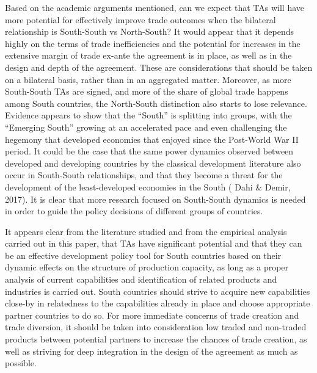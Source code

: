 \documentclass[12pt]{article}%
\begin{document}
Based on the academic arguments mentioned, can we expect that TAs will
have more potential for effectively improve trade outcomes when the
bilateral relationship is South-South vs North-South? It would appear
that it depends highly on the terms of trade inefficiencies and the
potential for increases in the extensive margin of trade ex-ante the
agreement is in place, as well as in the design and depth of the
agreement. These are considerations that should be taken on a bilateral
basis, rather than in an aggregated matter. Moreover, as more
South-South TAs are signed, and more of the share of global trade
happens among South countries, the North-South distinction also starts
to lose relevance. Evidence appears to show that the ``South'' is
splitting into groups, with the ``Emerging South'' growing at an
accelerated pace and even challenging the hegemony that developed
economies that enjoyed since the Post-World War II period. It could be
the case that the same power dynamics observed between developed and
developing countries by the classical development literature also occur
in South-South relationships, and that they become a threat for the
development of the least-developed economies in the South (\cite{dahi_south-south_2017} Dahi \&
Demir, 2017). It is clear that more research focused on South-South
dynamics is needed in order to guide the policy decisions of different
groups of countries.

It appears clear from the literature studied and from the empirical
analysis carried out in this paper, that TAs have significant potential
and that they can be an effective development policy tool for South
countries based on their dynamic effects on the structure of production
capacity, as long as a proper analysis of current capabilities and
identification of related products and industries is carried out. South
countries should strive to acquire new capabilities close-by in
relatedness to the capabilities already in place and choose appropriate
partner countries to do so. For more immediate concerns of trade
creation and trade diversion, it should be taken into consideration low
traded and non-traded products between potential partners to increase
the chances of trade creation, as well as striving for deep integration
in the design of the agreement as much as possible.

%
\end{document}
